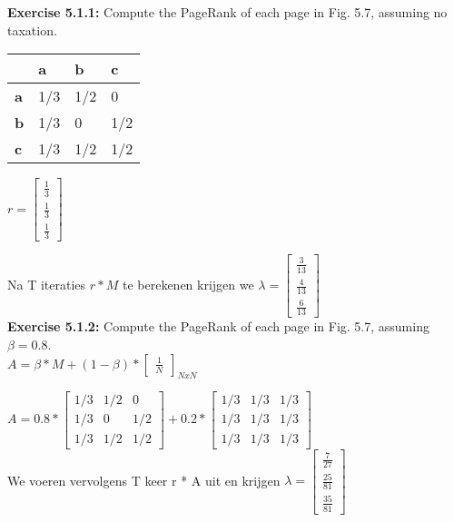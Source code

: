 \documentclass{exam}
\begin{document}
\begin{questions}
\question \textbf{Exercise 5.1.1:  }Compute the PageRank of each page in Fig. 5.7, assuming no taxation.\\


    \begin{tabular}{ | l | l | l | l |}
    \hline
    & \textbf{a} & \textbf{b} & \textbf{c} \\ \hline
    \textbf{a} & 1/3 & 1/2 & 0\\ \hline
    \textbf{b} & 1/3 & 0 & 1/2 \\ \hline
    \textbf{c} & 1/3 & 1/2 & 1/2  \\
    \hline
    \end{tabular}


$ r = \begin{bmatrix}
       \frac{1}{3} \\
       \frac{1}{3}\\
       \frac{1}{3}      
     \end{bmatrix}$

Na T iteraties $r * M$ te berekenen krijgen we $\lambda = \begin{bmatrix}
       \frac{3}{13} \\ \frac{4}{13} \\   \frac{6}{13}
     \end{bmatrix}$
\\
\question \textbf{Exercise 5.1.2:} Compute the PageRank of each page in Fig. 5.7, assuming
$\beta = 0.8$.\\

$A = \beta * M + (1 - \beta) * \begin{bmatrix}\frac{1}{N}\end{bmatrix}_{NxN}$

$A = 0.8 *  \begin{bmatrix}1/3 & 1/2 & 0\\ 
 1/3 & 0 & 1/2 \\ 
 1/3 & 1/2 & 1/2 \end{bmatrix} + 0.2 *  \begin{bmatrix}1/3 & 1/3 & 1/3\\ 
1/3 & 1/3 & 1/3\\ 
1/3 & 1/3 & 1/3 \end{bmatrix}$\\
We voeren vervolgens T keer r * A uit en krijgen  $\lambda = \begin{bmatrix}
       \frac{7}{27} \\ \frac{25}{81} \\   \frac{35}{81}
     \end{bmatrix}$\\


\end{questions}
\end{document}
